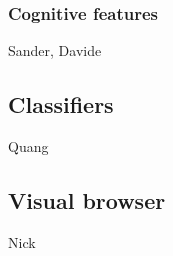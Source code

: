 \subsubsection{Cognitive features}
Sander, Davide

\subsection{Classifiers}
Quang

\subsection{Visual browser}
Nick
